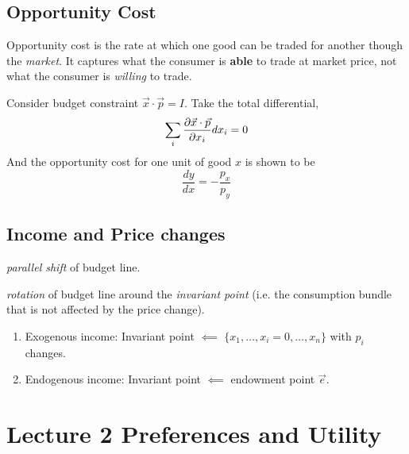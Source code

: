 \documentclass[]{article}
\begin{document}
        \subsection{Opportunity Cost}
            \par Opportunity cost is the rate at which one good can be traded for another though the \emph{market}. It captures what the consumer is \textbf{able} to trade at market price, not what the consumer is \emph{willing} to trade.
            \par Consider budget constraint $\vec{x}\cdot\vec{p}=I$. Take the total differential,
            \[
                \sum_i \frac{\partial{\vec{x}\cdot\vec{p}}}{\partial{x_i}} d{x_i} = 0
            \]
            And the opportunity cost for one unit of good $x$ is shown to be 
            \[
                \frac{dy}{dx} = -\frac{p_x}{p_y}
            \]
            
        \subsection{Income and Price changes}
        \par {} \emph{parallel shift} of budget line.
        \par {} \emph{rotation} of budget line around the \emph{invariant point} (i.e. the consumption bundle that is not affected by the price change).
            \begin{enumerate}
                \item Exogenous income: Invariant point $\impliedby$ $\{x_1, \dots, x_i=0, \dots, x_n\}$ with $p_i$ changes. 
                \item Endogenous income: Invariant point $\impliedby$ endowment point $\vec{e}$.
            \end{enumerate}
            
    \section{Lecture 2 Preferences and Utility}
\end{document}
